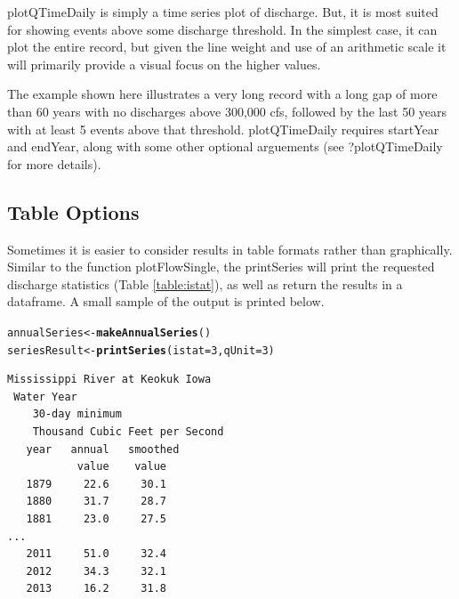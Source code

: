 \documentclass[a4paper,11pt]{article}\usepackage[]{graphicx}\usepackage[]{color}
\makeatletter
\newcommand{\hlnum}[1]{\textcolor[rgb]{0.686,0.059,0.569}{#1}}%
\newcommand{\hlstd}[1]{\textcolor[rgb]{0.345,0.345,0.345}{#1}}%
\newcommand{\hlkwb}[1]{\textcolor[rgb]{0.69,0.353,0.396}{#1}}%
\newcommand{\hlkwc}[1]{\textcolor[rgb]{0.333,0.667,0.333}{#1}}%
\newcommand{\hlkwd}[1]{\textcolor[rgb]{0.737,0.353,0.396}{\textbf{#1}}}%
\newenvironment{kframe}{%
 \def\at@end@of@kframe{}%
 \ifinner\ifhmode%
  \def\at@end@of@kframe{\end{minipage}}%
  \begin{minipage}{\columnwidth}%
 \fi\fi%
 \def\FrameCommand##1{\hskip\@totalleftmargin \hskip-\fboxsep
 \colorbox{shadecolor}{##1}\hskip-\fboxsep
     \hskip-\linewidth \hskip-\@totalleftmargin \hskip\columnwidth}%
 \MakeFramed {\advance\hsize-\width
   \@totalleftmargin\z@ \linewidth\hsize
   \@setminipage}}%
 {\par\unskip\endMakeFramed%
 \at@end@of@kframe}
\newenvironment{knitrout}{}{} %
\makeatother
\begin{document}
plotQTimeDaily is simply a time series plot of discharge.  But, it is most suited for showing events above some discharge threshold.  In the simplest case, it can plot the entire record, but given the line weight and use of an arithmetic scale it will primarily provide a visual focus on the higher values.

The example shown here illustrates a very long record with a long gap of more than 60 years with no discharges above 300,000 cfs, followed by the last 50 years with at least 5 events above that threshold. plotQTimeDaily requires startYear and endYear, along with some other optional arguements (see ?plotQTimeDaily for more details).

\FloatBarrier

\subsection{Table Options}
\label{sec:tableOptions}
Sometimes it is easier to consider results in table formats rather than graphically. Similar to the function plotFlowSingle, the printSeries will print the requested discharge statistics (Table \ref{table:istat}), as well as return the results in a dataframe. A small sample of the output is printed below.


\begin{knitrout}
\color{fgcolor}\begin{kframe}
\begin{alltt}
\hlstd{annualSeries}\hlkwb{<-}\hlkwd{makeAnnualSeries}\hlstd{()}
\hlstd{seriesResult} \hlkwb{<-} \hlkwd{printSeries}\hlstd{(}\hlkwc{istat}\hlstd{=}\hlnum{3}\hlstd{,} \hlkwc{qUnit}\hlstd{=}\hlnum{3}\hlstd{)}
\end{alltt}
\end{kframe}
\end{knitrout}

\begin{verbatim}
Mississippi River at Keokuk Iowa
 Water Year
    30-day minimum
    Thousand Cubic Feet per Second
   year   annual   smoothed
           value    value
   1879     22.6     30.1
   1880     31.7     28.7
   1881     23.0     27.5
...
   2011     51.0     32.4
   2012     34.3     32.1
   2013     16.2     31.8
\end{verbatim}
\end{document}
